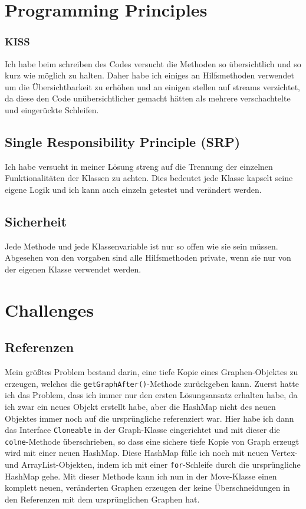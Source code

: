 \documentclass[12pt,a4paper]{article}
\begin{document}
\section{Programming Principles}
\subsubsection*{KISS}
Ich habe beim schreiben des Codes versucht die Methoden so übersichtlich und so kurz wie möglich zu halten. Daher habe ich einiges an Hilfsmethoden verwendet um die Übersichtbarkeit zu erhöhen und an einigen stellen auf streams verzichtet, da diese den Code unübersichtlicher gemacht hätten als mehrere verschachtelte und eingerückte Schleifen.

\subsection*{Single Responsibility Principle (SRP)}
Ich habe versucht in meiner Lösung streng auf die Trennung der einzelnen Funktionalitäten der Klassen zu achten. Dies bedeutet jede Klasse kapselt seine eigene Logik und ich kann auch einzeln getestet und verändert werden.

\subsection*{Sicherheit}
Jede Methode und jede Klassenvariable ist nur so offen wie sie sein müssen. Abgesehen von den vorgaben sind alle Hilfsmethoden private, wenn sie nur von der eigenen Klasse verwendet werden.

\section{Challenges}
\subsection{Referenzen}
Mein größtes Problem bestand darin, eine tiefe Kopie eines Graphen-Objektes zu erzeugen, welches die \texttt{getGraphAfter()}-Methode zurückgeben kann. Zuerst hatte ich das Problem, dass ich immer nur den ersten Lösungsansatz erhalten habe, da ich zwar ein neues Objekt erstellt habe, aber die HashMap nicht des neuen Objektes immer noch auf die ursprüngliche referenziert war. Hier habe ich dann das Interface \texttt{Cloneable} in der Graph-Klasse eingerichtet und mit dieser die \texttt{colne}-Methode überschrieben, so dass eine sichere tiefe Kopie von Graph erzeugt wird mit einer neuen HashMap. Diese HashMap fülle ich noch mit neuen Vertex- und ArrayList-Objekten, indem ich mit einer \texttt{for}-Schleife durch die ursprüngliche HashMap gehe. Mit dieser Methode kann ich nun in der Move-Klasse einen komplett neuen, veränderten Graphen erzeugen der keine Überschneidungen in den Referenzen mit dem ursprünglichen Graphen hat.
\end{document}
